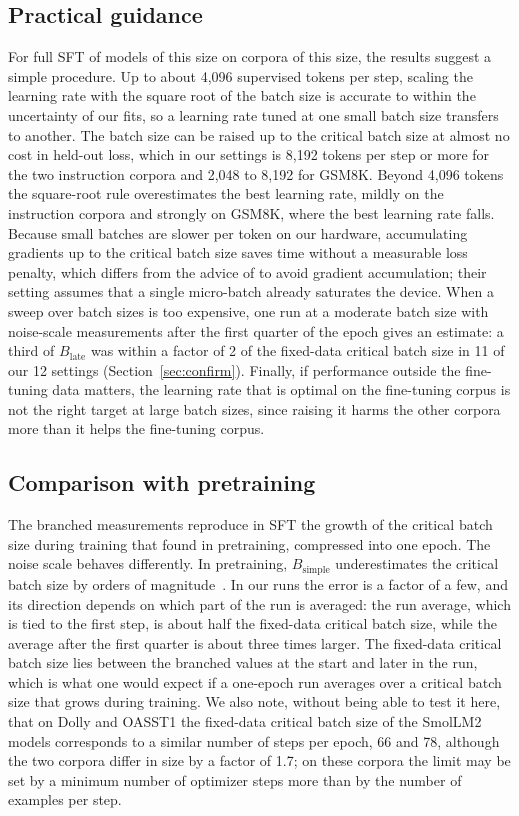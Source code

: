 \documentclass[10pt]{article}
\newcommand{\bsimple}{B_{\mathrm{simple}}}
\newcommand{\blate}{B_{\mathrm{late}}}
\begin{document}
\subsection{Practical guidance}

For full SFT of models of this size on corpora of this size, the results suggest a simple procedure. Up to about 4,096 supervised tokens per step, scaling the learning rate with the square root of the batch size is accurate to within the uncertainty of our fits, so a learning rate tuned at one small batch size transfers to another. The batch size can be raised up to the critical batch size at almost no cost in held-out loss, which in our settings is 8,192 tokens per step or more for the two instruction corpora and 2,048 to 8,192 for GSM8K. Beyond 4,096 tokens the square-root rule overestimates the best learning rate, mildly on the instruction corpora and strongly on GSM8K, where the best learning rate falls. Because small batches are slower per token on our hardware, accumulating gradients up to the critical batch size saves time without a measurable loss penalty, which differs from the advice of \citet{marek2025} to avoid gradient accumulation; their setting assumes that a single micro-batch already saturates the device. When a sweep over batch sizes is too expensive, one run at a moderate batch size with noise-scale measurements after the first quarter of the epoch gives an estimate: a third of $\blate$ was within a factor of 2 of the fixed-data critical batch size in 11 of our 12 settings (Section~\ref{sec:confirm}). Finally, if performance outside the fine-tuning data matters, the learning rate that is optimal on the fine-tuning corpus is not the right target at large batch sizes, since raising it harms the other corpora more than it helps the fine-tuning corpus.

\subsection{Comparison with pretraining}

The branched measurements reproduce in SFT the growth of the critical batch size during training that \citet{merrill2025} found in pretraining, compressed into one epoch. The noise scale behaves differently. In pretraining, $\bsimple$ underestimates the critical batch size by orders of magnitude~\citep{merrill2025}. In our runs the error is a factor of a few, and its direction depends on which part of the run is averaged: the run average, which is tied to the first step, is about half the fixed-data critical batch size, while the average after the first quarter is about three times larger. The fixed-data critical batch size lies between the branched values at the start and later in the run, which is what one would expect if a one-epoch run averages over a critical batch size that grows during training. We also note, without being able to test it here, that on Dolly and OASST1 the fixed-data critical batch size of the SmolLM2 models corresponds to a similar number of steps per epoch, 66 and 78, although the two corpora differ in size by a factor of 1.7; on these corpora the limit may be set by a minimum number of optimizer steps more than by the number of examples per step.
\end{document}
